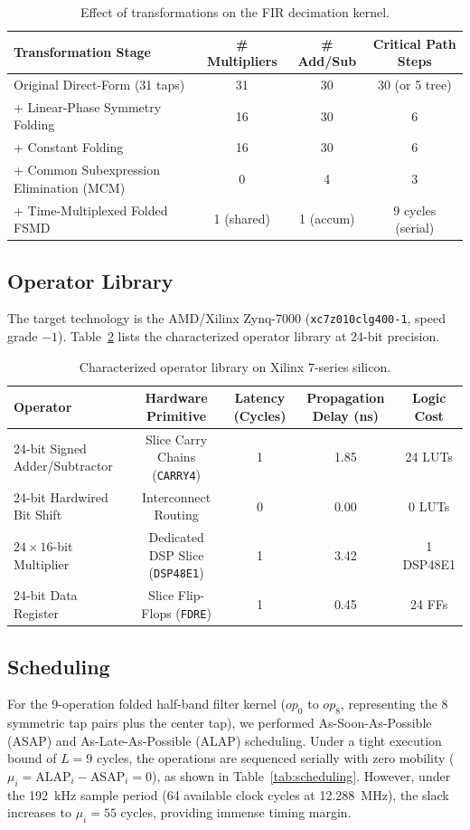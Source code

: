\documentclass[11pt,a4paper]{article}
\begin{document}
\begin{table}[H]\centering\small
\caption{Effect of transformations on the FIR decimation kernel.}\label{tab:transform}
\begin{tabular}{@{}lccc@{}}
\toprule
Transformation Stage & \# Multipliers & \# Add/Sub & Critical Path Steps\\
\midrule
Original Direct-Form (31 taps)           & 31 & 30 & 30 (or 5 tree)\\
+ Linear-Phase Symmetry Folding           & 16 & 30 & 6\\
+ Constant Folding                        & 16 & 30 & 6\\
+ Common Subexpression Elimination (MCM) & 0  & 4  & 3\\
+ Time-Multiplexed Folded FSMD            & 1 (shared) & 1 (accum) & 9 cycles (serial)\\
\bottomrule
\end{tabular}
\end{table}

\subsection{Operator Library}
The target technology is the AMD/Xilinx Zynq-7000 (\texttt{xc7z010clg400-1}, speed grade $-1$). Table~\ref{tab:oplib} lists the characterized operator library at 24-bit precision.

\begin{table}[H]\centering\small
\caption{Characterized operator library on Xilinx 7-series silicon.}\label{tab:oplib}
\begin{tabular}{@{}lcccc@{}}
\toprule
Operator & Hardware Primitive & Latency (Cycles) & Propagation Delay (ns) & Logic Cost\\
\midrule
24-bit Signed Adder/Subtractor & Slice Carry Chains (\texttt{CARRY4}) & 1 & 1.85 & 24 LUTs\\
24-bit Hardwired Bit Shift     & Interconnect Routing                 & 0 & 0.00 & 0 LUTs\\
$24 \times 16$-bit Multiplier  & Dedicated DSP Slice (\texttt{DSP48E1})& 1 & 3.42 & 1 DSP48E1\\
24-bit Data Register           & Slice Flip-Flops (\texttt{FDRE})     & 1 & 0.45 & 24 FFs\\
\bottomrule
\end{tabular}
\end{table}

\subsection{Scheduling}
For the 9-operation folded half-band filter kernel ($op_0$ to $op_8$, representing the 8 symmetric tap pairs plus the center tap), we performed As-Soon-As-Possible (ASAP) and As-Late-As-Possible (ALAP) scheduling. Under a tight execution bound of $L = 9$ cycles, the operations are sequenced serially with zero mobility ($\mu_i = \text{ALAP}_i - \text{ASAP}_i = 0$), as shown in Table~\ref{tab:scheduling}. However, under the 192~kHz sample period (64 available clock cycles at 12.288~MHz), the slack increases to $\mu_i = 55$ cycles, providing immense timing margin.
\end{document}
